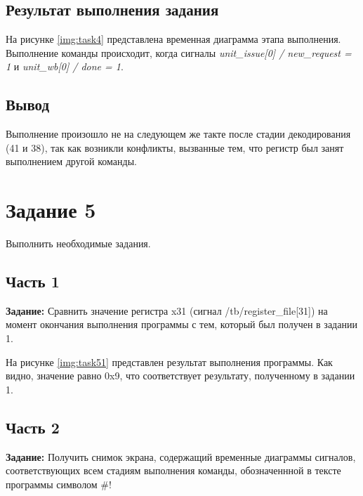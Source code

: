 \subsection{Результат выполнения задания}

На рисунке \ref{img:task4} представлена временная диаграмма этапа выполнения. Выполнение команды происходит, когда сигналы \textit{unit\_issue[0] / new\_request = 1} и \textit{unit\_wb[0] / done = 1}.


\clearpage


\subsection{Вывод}

Выполнение произошло не на следующем же такте после стадии декодирования (41 и 38), так как возникли конфликты, вызванные тем, что регистр был занят выполнением другой команды.



\section{Задание 5}

Выполнить необходимые задания.

\subsection{Часть 1}

\textbf{Задание:} Сравнить значение регистра x31 (сигнал /tb/register\_file[31]) на момент окончания выполнения программы с тем, который был получен в задании 1.

На рисунке \ref{img:task51} представлен результат выполнения программы. Как видно, значение равно 0x9, что соответствует результату, полученному в задании 1.


\clearpage


\subsection{Часть 2}

\textbf{Задание:} Получить снимок экрана, содержащий временные диаграммы сигналов, соответствующих всем стадиям выполнения команды, обозначеннной в тексте программы символом \#!

